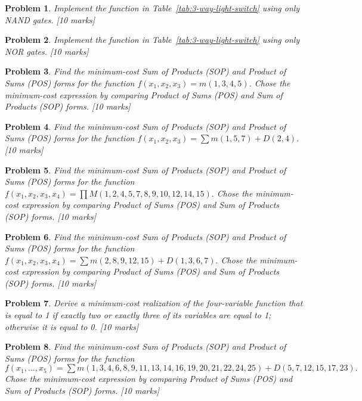 \documentclass[twocolumn]{article}
\newtheorem{prob}{Problem}
\begin{document}
\begin{prob}
 Implement the function in Table~\ref{tab:3-way-light-switch} using only NAND
 gates. [10 marks]
\end{prob}

\begin{prob}
 Implement the function in Table~\ref{tab:3-way-light-switch} using only NOR
 gates. [10 marks]
\end{prob}


\begin{prob}
Find the minimum-cost Sum of Products (SOP) and Product of Sums (POS) forms for the function $f(x_1 , x_2 , x_3 ) =
m(1, 3, 4, 5)$.  Chose the minimum-cost expression by comparing Product of Sums (POS) and Sum of Products (SOP) forms. [10 marks]
\label{prob:237}
\end{prob}

\begin{prob}
Find the minimum-cost Sum of Products (SOP) and Product of Sums (POS) forms for the function $f(x_1 , x_2 , x_3) =
\sum m(1, 5, 7) + D(2, 4)$.  [10 marks]
\end{prob}

\begin{prob}
Find the minimum-cost Sum of Products (SOP) and Product of Sums (POS) forms for the function $f(x_1 , x_2 , x_3,
x_4) = \prod M(1, 2, 4, 5, 7, 8, 9, 10, 12, 14, 15).$  Chose the minimum-cost
expression by comparing Product of Sums (POS) and Sum of Products (SOP) forms. [10 marks]
\end{prob}

\begin{prob}
Find the minimum-cost Sum of Products (SOP) and Product of Sums (POS) forms for the function $f(x_1 , x_2 , x_3, x_4) =
\sum m(2, 8, 9, 12, 15) + D(1, 3, 6, 7).$  Chose the minimum-cost expression
by comparing Product of Sums (POS) and Sum of Products (SOP) forms. [10 marks]
\end{prob}

\begin{prob}
Derive a minimum-cost realization of the four-variable function that is equal to 1 if exactly
two or exactly three of its variables are equal to 1; otherwise it is equal to
0.  [10 marks]
\end{prob}

\begin{prob}
  Find the minimum-cost Sum of Products (SOP) and Product of Sums (POS) forms for the function $f(x_1 , \dots, x_5) =
  \sum m(1, 3, 4, 6, 8, 9, 11, 13, 14, 16, 19, 20, 21, 22, 24, 25) + D(5, 7,
  12, 15, 17, 23).$  Chose the minimum-cost expression by comparing Product of Sums (POS) and Sum of Products (SOP) forms. [10 marks]
\end{prob}
\end{document}
